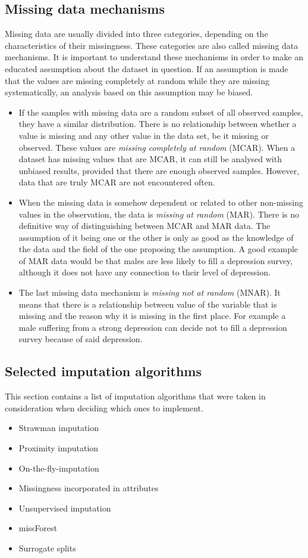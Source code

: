 \documentclass[11pt]{article}
\begin{document}
    \subsection{Missing data mechanisms}
      Missing data are usually divided into three categories, depending on the characteristics of their missingness. These categories are also called missing data mechanisms. \cite{lwd} It is important to understand these mechanisms in order to make an educated assumption about the dataset in question. If an assumption is made that the values are missing completely at random while they are missing systematically, an analysis based on this assumption may be biased.
      \begin{itemize}
      \item If the samples with missing data are a random subset of all observed samples, they have a similar distribution. There is no relationship between whether a value is missing and any other value in the data set, be it missing or observed. These values are {\it missing completely at random} (MCAR). \cite{lwd} When a dataset has missing values that are MCAR, it can still be analysed with unbiased results, provided that there are enough observed samples. However, data that are truly MCAR are not encountered often.
      \item When the missing data is somehow dependent or related to other non-missing values in the observation, the data is {\it missing at random} (MAR). \cite{lwd} There is no definitive way of distinguishing between MCAR and MAR data. The assumption of it being one or the other is only as good as the knowledge of the data and the field of the one proposing the assumption. A good example of MAR data would be that males are less likely to fill a depression survey, although it does not have any connection to their level of depression.
      \item The last missing data mechanism is {\it missing not at random} (MNAR). It means that there is a relationship between value of the variable that is missing and the reason why it is missing in the first place. For example a male suffering from a strong depression can decide not to fill a depression survey because of said depression.
      \end{itemize}
    \subsection{Selected imputation algorithms}
      This section contains a list of imputation algorithms that were taken in consideration when deciding which ones to implement.
      \begin{itemize}
      \item Strawman imputation
      \item Proximity imputation
      \item On-the-fly-imputation
      \item Missingness incorporated in attributes
      \item Unsupervised imputation
      \item missForest
      \item Surrogate splits
      \end{itemize}
\end{document}
